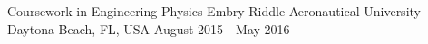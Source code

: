\begin{cventries}
    \vspace{-16pt}

  \cventry
    {Coursework in Engineering Physics} %
    {Embry-Riddle Aeronautical University} %
    {Daytona Beach, FL, USA} %
    {August 2015 - May 2016} %
        {
    }

\end{cventries}

\vspace{-20pt}